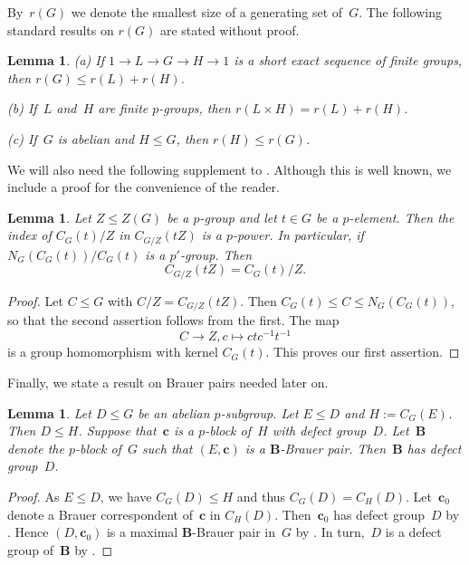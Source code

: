 \documentclass[12pt]{amsart}
\newcommand{\bB}{{\mathbf{B}}}
\newcommand{\bc}{{\mathbf{c}}}
\newtheorem{lem}[thm]{Lemma}
\theoremstyle{theorem}
\theoremstyle{definition}
\theoremstyle{remark}
\begin{document}
By~$r(G)$ we denote the smallest size of a generating set of~$G$. The following 
standard results on $r(G)$ are stated without proof.

\begin{lem}
\label{MinimalGeneratingSet}
{\rm (a)} If $1 \rightarrow L \rightarrow G \rightarrow H \rightarrow 1$ is a
short exact sequence of finite groups, then $r(G) \leq r(L) + r(H)$.

{\rm (b)} If~$L$ and~$H$ are finite $p$-groups, then $r(L \times H) = r(L) + r(H)$.

{\rm (c)} If~$G$ is abelian and $H \leq G$, then $r(H) \leq r(G)$.
\end{lem}

We will also need the following supplement to \cite[Lemma~$2.2$]{HL24}. Although
this is well known, we include a proof for the convenience of the reader.

\begin{lem}
\label{CentralizersModZ}
Let $Z \leq Z(G)$ be a $p$-group and let $t \in G$ be a $p$-element.
Then the index of $C_G( t )/Z$ in $C_{G/Z}( tZ )$ is a $p$-power.
In particular, if $N_G(C_G(t))/C_G(t)$ is a $p'$-group. Then 
$$C_{G/Z}( tZ ) = C_G( t )/Z.$$
\end{lem}
\begin{proof}
Let $C \leq G$ with $C/Z = C_{G/Z}( tZ )$. Then 
$C_G( t ) \leq C \leq N_G(C_G(t))$, so that the second assertion follows from 
the first.
The map 
$$C \rightarrow Z, c \mapsto ctc^{-1}t^{-1}$$ is a group homomorphism with 
kernel $C_G( t )$. This proves
our first assertion. 
\end{proof}

Finally, we state a result on Brauer pairs needed later on.
\begin{lem}
\label{BrauerPairsLem}
Let $D \leq G$ be an abelian $p$-subgroup. Let $E \leq D$ and $H := C_G( E )$.
Then $D \leq H$. Suppose that~$\bc$ is a $p$-block of~$H$ with defect group~$D$.
Let~$\bB$ denote the $p$-block of~$G$ such that $(E,\bc)$ is a $\bB$-Brauer 
pair. Then~$\bB$ has defect group~$D$.
\end{lem}
\begin{proof}
As $E \leq D$, we have $C_G( D ) \leq H$ and thus $C_G( D ) = C_H( D )$. 
Let~$\bc_0$ denote a Brauer correspondent of~$\bc$ in $C_H( D )$. Then~$\bc_0$
has defect group~$D$ by \cite[Corollary~$6.3.12$]{LinckBook}. Hence $(D,\bc_0)$
is a maximal $\bB$-Brauer pair in~$G$ by \cite[Theorem~$3.10$]{AlpBro}. In 
turn,~$D$ is a defect group of~$\bB$ by \cite[Theorem~$6.3.7$]{LinckBook}.
\end{proof}
\end{document}
